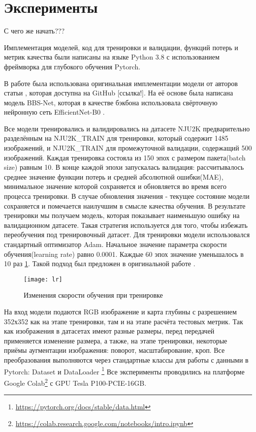 \section{Эксперименты}

С чего же начать???

Имплементация моделей, код для тренировки и валидации, функций потерь и метрик качества были написаны на языке Python 3.8
с использованием фреймворка для глубокого обучения Pytorch\cite{Pytorch}.

В работе была использована оригинальная имплементации модели от авторов статьи \cite{BBS}, которая доступна на GitHub [ссылка!].
На её основе была написана модель BBS-Net, которая в качестве бэкбона использовала свёрточную нейронную сеть EfficientNet-B0 \cite{Efficientnet}.



Все модели тренировались и валидировались на датасете NJU2K предварительно разделённым на NJU2K\_TRAIN для тренировки, 
который содержит 1485 изображений, и NJU2K\_TRAIN для промежуточной валидации, содержащий 500 изображений.
Каждая тренировка состояла из 150 эпох с размером пакета(batch size) равным 10. В конце каждой эпохи запускалась валидация: рассчитывалось среднее
значение функции потерь и средней абсолютной ошибки(MAE), минимальное значение которой сохраняется и обновляется во время
всего процесса тренировки. В случае обновления значения - текущее состояние модели сохраняется и помечается наилучшим в смысле качества обучения.
В результате тренировки мы получаем модель, которая показывает наименьшую ошибку на валидационном датасете. Такая стратегия используется для того,
чтобы избежать переобучения под тренировочный датасет. 
Для тренировки модели использовался стандартный оптимизатор Adam\cite{Adam}. Начальное значение параметра скорости обучения(learning rate) 
равно 0.0001. Каждые 60 эпох значение уменьшалось в 10 раз \ref{fig:lr}. Такой подход был предложен в оригинальной работе \cite{BBS}.

\begin{figure}[h]
    \centering
    \texttt{[image: lr]}
    \caption{Изменения скорости обучения при тренировке}
    \label{fig:lr}
\end{figure}

На вход модели подаются RGB изображение и карта глубины с разрешением 352х352 как на этапе тренировки, там и на этапе расчёта тестовых метрик.
Так как изображения в датасетах имеют разные размеры, перед передачей применяется изменение размера, а также, на этапе тренировки, некоторые приёмы аугментации 
изображения: поворот, масштабирование, кроп. Все преобразования выполняются через стандартные классы для работы с данными в Pytorch: Dataset и DataLoader
\footnote{\url{https://pytorch.org/docs/stable/data.html}}
Все эксперименты проводились на платформе Google Colab\footnote{\url{https://colab.research.google.com/notebooks/intro.ipynb}}
с GPU Tesla P100-PCIE-16GB.



